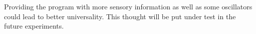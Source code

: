 \documentclass{ExcelAtFIT}
\begin{document}
Providing the program with more sensory information as well as some oscillators could lead to better universality.
This thought will be put under test in the future experiments.

%
%





\end{document}
